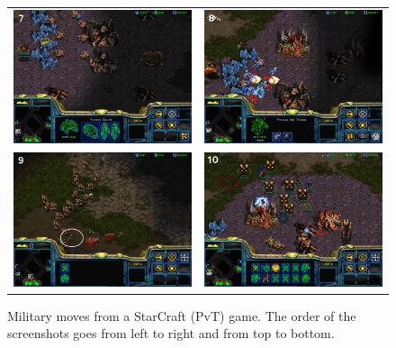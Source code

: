\begin{figure}[!ht]
\begin{center}
\begin{tabular}{cc}
\includegraphics[width=0.48\columnwidth]{images/SC_game/SC_drop2a.png} &
\includegraphics[width=0.48\columnwidth]{images/SC_game/SC_drop2b.png} \\
\includegraphics[width=0.48\columnwidth]{images/SC_game/SC_dt_army.png} & 
\includegraphics[width=0.48\columnwidth]{images/SC_game/SC_final_attack.png}
\end{tabular}
\caption{Military moves from a StarCraft (PvT) game. The order of the screenshots goes from left to right and from top to bottom.}
\label{fig:SC_game2}
\end{center}
\end{figure}


